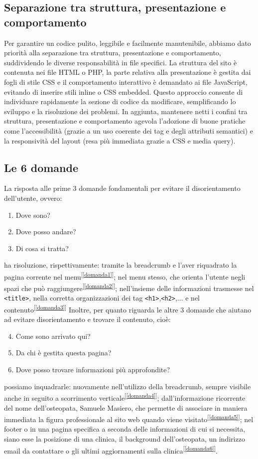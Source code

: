 \documentclass{article}
\begin{document}
\subsection{Separazione tra struttura, presentazione e comportamento}
Per garantire un codice pulito, leggibile e facilmente manutenibile, abbiamo dato priorità alla separazione tra struttura, presentazione e comportamento, suddividendo le diverse responsabilità in file specifici. La struttura del sito è contenuta nei file HTML o PHP, la parte relativa alla presentazione è gestita dai fogli di stile CSS e il comportamento interattivo è demandato ai file JavaScript, evitando di inserire stili inline o CSS embedded. Questo approccio consente di individuare rapidamente la sezione di codice da modificare, semplificando lo sviluppo e la risoluzione dei problemi. In aggiunta, mantenere netti i confini tra struttura, presentazione e comportamento agevola l'adozione di buone pratiche come l'accessibilità (grazie a un uso coerente dei tag e degli attributi semantici) e la responsività del layout (resa più immediata grazie a CSS e media query).
\subsection{Le 6 domande}
La risposta alle prime 3 domande fondamentali per evitare il disorientamento dell'utente, ovvero:
\begin{enumerate}
    \item Dove sono? \label{domanda1}
    \item Dove posso andare? \label{domanda2}
    \item Di cosa si tratta? \label{domanda3}
\end{enumerate}
ha risoluzione, rispettivamente: tramite la breadcrumb e l'aver riquadrato la pagina corrente nel menu\textsuperscript{[\ref{domanda1}]}; nel menu stesso, che orienta l'utente negli spazi che può raggiungere\textsuperscript{[\ref{domanda2}]}; nell'insieme delle informazioni trasmesse nel \verb|<title>|, nella corretta organizzazioni dei tag \verb|<h1>|,\verb|<h2>|,... e nel contenuto\textsuperscript{[\ref{domanda3}]}
\newpage Inoltre, per quanto riguarda le altre 3 domande che aiutano ad evitare disorientamento e trovare il contenuto, cioè:
\begin{enumerate}
    \setcounter{enumi}{3}
    \item Come sono arrivato qui? \label{domanda4}
    \item Da chi è gestita questa pagina? \label{domanda5}
    \item Dove posso trovare informazioni più approfondite? \label{domanda6}
\end{enumerate}
possiamo inquadrarle: nuovamente nell'utilizzo della breadcrumb, sempre visibile anche in seguito a scorrimento verticale\textsuperscript{[\ref{domanda4}]}; dall'informazione ricorrente del nome dell'osteopata, Samuele Masiero, che permette di associare in maniera immediata la figura professionale al sito web quando viene visitato\textsuperscript{[\ref{domanda5}]}; nel footer o in una pagina specifica a seconda delle informazioni di cui si necessita, siano esse la posizione di una clinica, il background dell'osteopata, un indirizzo email da contattare o gli ultimi aggiornamenti sulla clinica\textsuperscript{[\ref{domanda6}]}.
\end{document}
